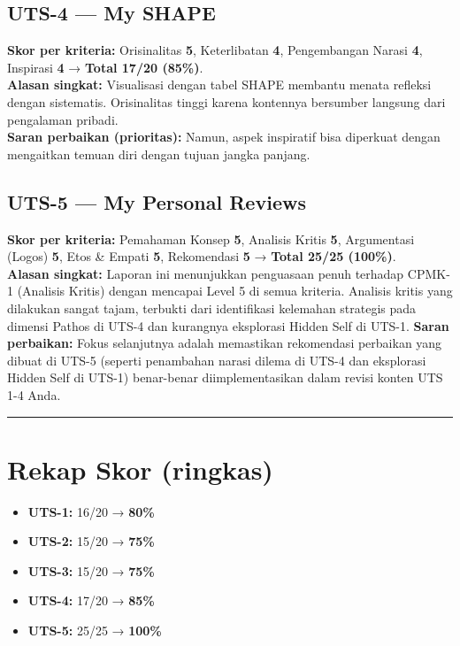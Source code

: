 \documentclass[
  letterpaper,
  DIV=11,
  numbers=noendperiod]{scrreprt}
\providecommand{\tightlist}{%
  \setlength{\itemsep}{0pt}\setlength{\parskip}{0pt}}
\begin{document}
\subsection{UTS-4 --- My SHAPE}\label{uts-4-my-shape}

\textbf{Skor per kriteria:} Orisinalitas \textbf{5}, Keterlibatan
\textbf{4}, Pengembangan Narasi \textbf{4}, Inspirasi \textbf{4} →
\textbf{Total 17/20 (85\%)}.\\
\textbf{Alasan singkat:} Visualisasi dengan tabel SHAPE membantu menata
refleksi dengan sistematis. Orisinalitas tinggi karena kontennya
bersumber langsung dari pengalaman pribadi.\\
\textbf{Saran perbaikan (prioritas):} Namun, aspek inspiratif bisa
diperkuat dengan mengaitkan temuan diri dengan tujuan jangka panjang.

\subsection{UTS-5 --- My Personal
Reviews}\label{uts-5-my-personal-reviews-1}

\textbf{Skor per kriteria:} Pemahaman Konsep \textbf{5}, Analisis Kritis
\textbf{5}, Argumentasi (Logos) \textbf{5}, Etos \& Empati \textbf{5},
Rekomendasi \textbf{5} → \textbf{Total 25/25 (100\%)}.\\
\textbf{Alasan singkat:} Laporan ini menunjukkan penguasaan penuh
terhadap CPMK-1 (Analisis Kritis) dengan mencapai Level 5 di semua
kriteria. Analisis kritis yang dilakukan sangat tajam, terbukti dari
identifikasi kelemahan strategis pada dimensi Pathos di UTS-4 dan
kurangnya eksplorasi Hidden Self di UTS-1. \textbf{Saran perbaikan:}
Fokus selanjutnya adalah memastikan rekomendasi perbaikan yang dibuat di
UTS-5 (seperti penambahan narasi dilema di UTS-4 dan eksplorasi Hidden
Self di UTS-1) benar-benar diimplementasikan dalam revisi konten UTS 1-4
Anda.

\begin{center}\rule{0.5\linewidth}{0.5pt}\end{center}

\section{Rekap Skor (ringkas)}\label{rekap-skor-ringkas}

\begin{itemize}
\tightlist
\item
  \textbf{UTS-1:} 16/20 → \textbf{80\%}
\item
  \textbf{UTS-2:} 15/20 → \textbf{75\%}
\item
  \textbf{UTS-3:} 15/20 → \textbf{75\%}
\item
  \textbf{UTS-4:} 17/20 → \textbf{85\%}
\item
  \textbf{UTS-5:} 25/25 → \textbf{100\%}
\end{itemize}
\end{document}
